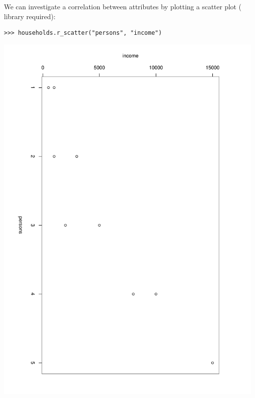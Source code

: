 We can investigate a correlation  between attributes \attributesindex by plotting a scatter
plot \scatterplotindex ( \rpyindex library required):
\scatterplotindex
\begin{verbatim}
>>> households.r_scatter("persons", "income")
\end{verbatim}
\begin{center}
\includegraphics[scale=0.3, angle=90]{images/incomerscatter.pdf}

\end{center}
